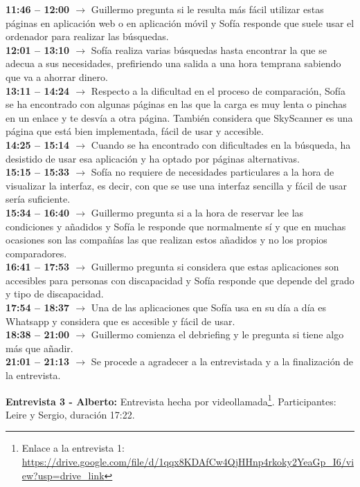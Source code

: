 \textbf{11:46 -- 12:00 $\rightarrow$} Guillermo pregunta si le resulta más fácil utilizar estas páginas en aplicación web o en aplicación móvil y Sofía responde que suele usar el ordenador para realizar las búsquedas. \\
\textbf{12:01 -- 13:10 $\rightarrow$} Sofía realiza varias búsquedas hasta encontrar la que se adecua a sus necesidades, prefiriendo una salida a una hora temprana sabiendo que va a ahorrar dinero. \\
\textbf{13:11 -- 14:24 $\rightarrow$} Respecto a la dificultad en el proceso de comparación, Sofía se ha encontrado con algunas páginas en las que la carga es muy lenta o pinchas en un enlace y te desvía a otra página. También considera que SkyScanner es una página que está bien implementada, fácil de usar y accesible. \\
\textbf{14:25 -- 15:14 $\rightarrow$} Cuando se ha encontrado con dificultades en la búsqueda, ha desistido de usar esa aplicación y ha optado por páginas alternativas. \\
\textbf{15:15 -- 15:33 $\rightarrow$} Sofía no requiere de necesidades particulares a la hora de visualizar la interfaz, es decir, con que se use una interfaz sencilla y fácil de usar sería suficiente. \\
\textbf{15:34 -- 16:40 $\rightarrow$} Guillermo pregunta si a la hora de reservar lee las condiciones y añadidos y Sofía le responde que normalmente sí y que en muchas ocasiones son las compañías las que realizan estos añadidos y no los propios comparadores. \\
\textbf{16:41 -- 17:53 $\rightarrow$} Guillermo pregunta si considera que estas aplicaciones son accesibles para personas con discapacidad y Sofía responde que depende del grado y tipo de discapacidad. \\
\textbf{17:54 -- 18:37 $\rightarrow$} Una de las aplicaciones que Sofía usa en su día a día es Whatsapp y considera que es accesible y fácil de usar. \\
\textbf{18:38 -- 21:00 $\rightarrow$} Guillermo comienza el debriefing y le pregunta si tiene algo más que añadir. \\
\textbf{21:01 -- 21:13 $\rightarrow$} Se procede a agradecer a la entrevistada y a la finalización de la entrevista.

\textbf{Entrevista 3 - Alberto:} Entrevista hecha por videollamada\footnote{Enlace a la entrevista 1: \url{https://drive.google.com/file/d/1qqx8KDAfCw4QjHHnp4rkoky2YeaGp_I6/view?usp=drive_link}}. Participantes: Leire y Sergio, duración 17:22.

